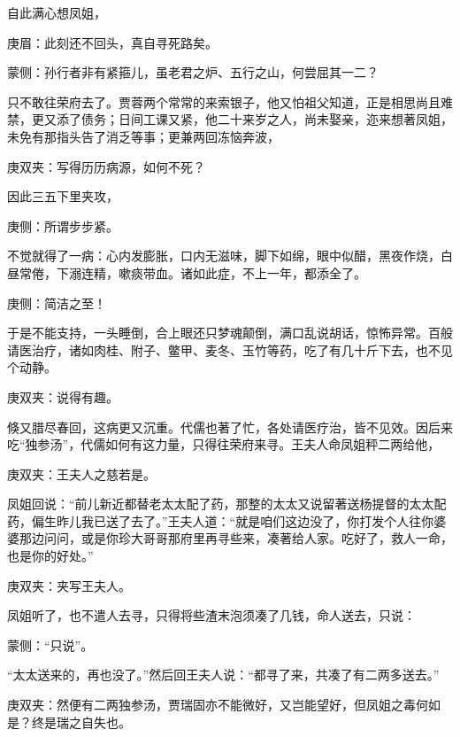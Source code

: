 \begin{parag}
    自此满心想凤姐，\begin{note}庚眉：此刻还不回头，真自寻死路矣。\end{note}\begin{note}蒙侧：孙行者非有紧箍儿，虽老君之炉、五行之山，何尝屈其一二？\end{note}只不敢往荣府去了。贾蓉两个常常的来索银子，他又怕祖父知道，正是相思尚且难禁，更又添了债务；日间工课又紧，他二十来岁之人，尚未娶亲，迩来想著凤姐，未免有那指头告了消乏等事；更兼两回冻恼奔波，\begin{note}庚双夹：写得历历病源，如何不死？\end{note}因此三五下里夹攻，\begin{note}庚侧：所谓步步紧。\end{note}不觉就得了一病：心内发膨胀，口内无滋味，脚下如绵，眼中似醋，黑夜作烧，白昼常倦，下溺连精，嗽痰带血。诸如此症，不上一年，都添全了。\begin{note}庚侧：简洁之至！\end{note}于是不能支持，一头睡倒，合上眼还只梦魂颠倒，满口乱说胡话，惊怖异常。百般请医治疗，诸如肉桂、附子、鳖甲、麦冬、玉竹等药，吃了有几十斤下去，也不见个动静。\begin{note}庚双夹：说得有趣。\end{note}
\end{parag}


\begin{parag}
    倏又腊尽春回，这病更又沉重。代儒也著了忙，各处请医疗治，皆不见效。因后来吃“独参汤”，代儒如何有这力量，只得往荣府来寻。王夫人命凤姐秤二两给他，\begin{note}庚双夹：王夫人之慈若是。\end{note}凤姐回说：“前儿新近都替老太太配了药，那整的太太又说留著送杨提督的太太配药，偏生昨儿我已送了去了。”王夫人道：“就是咱们这边没了，你打发个人往你婆婆那边问问，或是你珍大哥哥那府里再寻些来，凑著给人家。吃好了，救人一命，也是你的好处。”\begin{note}庚双夹：夹写王夫人。\end{note}凤姐听了，也不遣人去寻，只得将些渣末泡须凑了几钱，命人送去，只说：\begin{note}蒙侧：“只说”。\end{note}“太太送来的，再也没了。”然后回王夫人说：“都寻了来，共凑了有二两多送去。”\begin{note}庚双夹：然便有二两独参汤，贾瑞固亦不能微好，又岂能望好，但凤姐之毒何如是？终是瑞之自失也。\end{note}
\end{parag}


